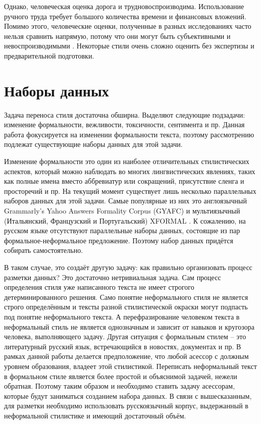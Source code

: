 Однако, человеческая оценка дорога и трудновоспроизводима.
Использование ручного труда требует большого количества времени и финансовых вложений.
Помимо этого, человеческие оценки, полученные в разных исследованиях часто нельзя сравнить напрямую, потому что они могут быть субъективными и невоспроизводимыми \cite{belz-etal-2020-reprogen}.
Некоторые стили очень сложно оценить без экспертизы и предварительной подготовки.



\section{Наборы данных} \label{cha:analysis:sec:datasets}
Задача переноса стиля достаточна обширна.
Выделяют следующие подзадачи: изменение формальности, вежливости, токсичности, сентимента и пр.
Данная работа фокусируется на изменении формальности текста, поэтому рассмотрению подлежат существующие наборы данных для этой задачи.

Изменение формальности это один из наиболее отличительных стилистических аспектов, который можно наблюдать во многих лингвистических явлениях, таких как  полные имена вместо аббревиатур или сокращений, присутствие сленга и просторечий и пр.
На текущий момент существует лишь несколько параллельных наборов данных для этой задачи. Самые популярные из них это англоязычный Grammarly’s Yahoo Answers Formality Corpus (GYAFC) \cite{gyafc} и мультиязычный (Итальянский, Французский и Португальский) XFORMAL \cite{xformal}.
К сожалению, на русском языке отсутствуют параллельные наборы данных, состоящие из пар формальное-неформальное предложение.
Поэтому набор данных придётся собирать самостоятельно.

В таком случае, это создаёт другую задачу: как правильно организовать процесс разметки данных? Это достаточно нетривиальная задача.
Сам процесс определения стиля уже написанного текста не имеет строгого детерминированного решения.
Само понятие неформального стиля не является строго определённым и тексты разной стилистической окраски могут подпасть под понятие неформального текста.
А перефразирование человеком текста в неформальный стиль не является однозначным и зависит от навыков и кругозора человека, выполняющего задачу.
Другая ситуация с формальным стилем -- это литературный русский язык, встречающийся в новостях, документах и пр.
В рамках данной работы делается предположение, что любой асессор с должным уровнем образования, владеет этой стилистикой.
Переписать неформальный текст в формальном стиле является более простой и объяснимой задачей, нежели обратная.
Поэтому таким образом и необходимо ставить задачу асессорам, которые будут заниматься созданием набора данных.
В связи с вышесказанным, для разметки необходимо использовать русскоязычный корпус, выдержанный в неформальной стилистике и имеющий достаточный объём.


